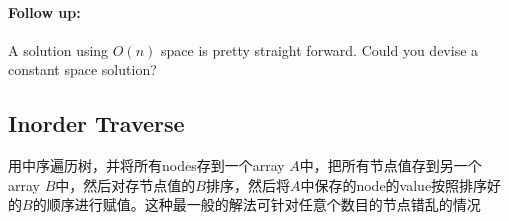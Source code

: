 \paragraph{Follow up:}
\begin{flushleft}
A solution using $O(n)$ space is pretty straight forward. Could you devise a constant space solution?
\end{flushleft}
\subsection{Inorder Traverse}
用中序遍历树，并将所有nodes存到一个array $A$中，把所有节点值存到另一个array $B$中，然后对存节点值的$B$排序，然后将$A$中保存的node的value按照排序好的$B$的顺序进行赋值。这种最一般的解法可针对任意个数目的节点错乱的情况
